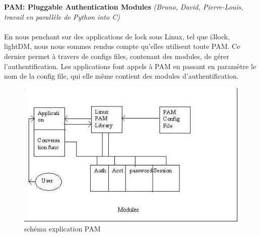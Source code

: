 \documentclass[french]{report}
\begin{document}
  \vspace{0.5cm}

  \textbf{PAM: Pluggable Authentication Modules} \emph{(Bruno, David,
  Pierre-Louis, travail en parallèle de Python into C)}\\\\
En nous penchant sur des applications de lock sous Linux, tel que i3lock,
lightDM, nous nous sommes rendus compte qu’elles utilisent toute PAM.
Ce dernier permet à travers de configs files, contenant des modules, de
gérer l’authentification. Les applications font appels à PAM en passant en
paramètre le nom de la config file, qui elle même contient des modules
d’authentification.

  \begin{figure}[h]
    \begin{center}
    \includegraphics[width=0.8\linewidth]{pam}
    \caption{schéma explication PAM}
  \end{center}
  \end{figure}
\end{document}

